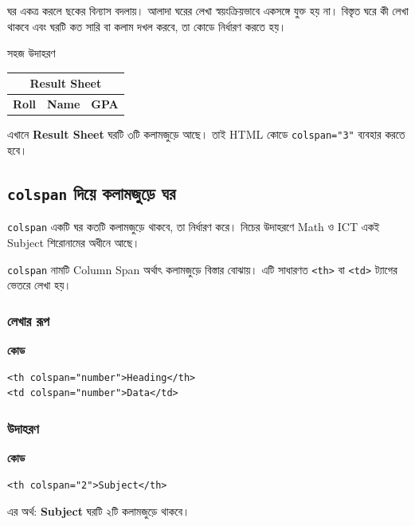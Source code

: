 ঘর একত্র করলে ছকের বিন্যাস বদলায়। আলাদা ঘরের লেখা স্বয়ংক্রিয়ভাবে একসঙ্গে যুক্ত হয় না। বিস্তৃত ঘরে কী লেখা থাকবে এবং ঘরটি কত সারি বা কলাম দখল করবে, তা কোডে নির্ধারণ করতে হয়।

\begin{examplebox}{সহজ উদাহরণ}
\begin{center}
\begin{tabular}{|c|c|c|}
\hline
\multicolumn{3}{|c|}{\textbf{Result Sheet}} \\
\hline
\textbf{Roll} & \textbf{Name} & \textbf{GPA} \\
\hline
\end{tabular}
\end{center}
এখানে \textbf{Result Sheet} ঘরটি ৩টি কলামজুড়ে আছে। তাই HTML কোডে \texttt{colspan="3"} ব্যবহার করতে হবে।
\end{examplebox}

\subsection{\texttt{colspan} দিয়ে কলামজুড়ে ঘর}

\texttt{colspan} একটি ঘর কতটি কলামজুড়ে থাকবে, তা নির্ধারণ করে। নিচের উদাহরণে Math ও ICT একই Subject শিরোনামের অধীনে আছে।

\texttt{colspan} নামটি Column Span অর্থাৎ কলামজুড়ে বিস্তার বোঝায়। এটি সাধারণত \texttt{<th>} বা \texttt{<td>} ট্যাগের ভেতরে লেখা হয়।

\par\noindent
\begin{minipage}[t]{.54\linewidth}\vspace{0pt}\small
\subsubsection{লেখার রূপ}

\textbf{\color{chFourTeal}কোড}\par
\begin{verbatim}
<th colspan="number">Heading</th>
<td colspan="number">Data</td>
\end{verbatim}
\par\smallskip
\end{minipage}\hfill
\begin{minipage}[t]{.42\linewidth}\vspace{0pt}\small
\subsubsection{উদাহরণ}

\textbf{\color{chFourTeal}কোড}\par
\begin{verbatim}
<th colspan="2">Subject</th>
\end{verbatim}
\par\smallskip


এর অর্থ: \textbf{Subject} ঘরটি ২টি কলামজুড়ে থাকবে।
\end{minipage}\par
